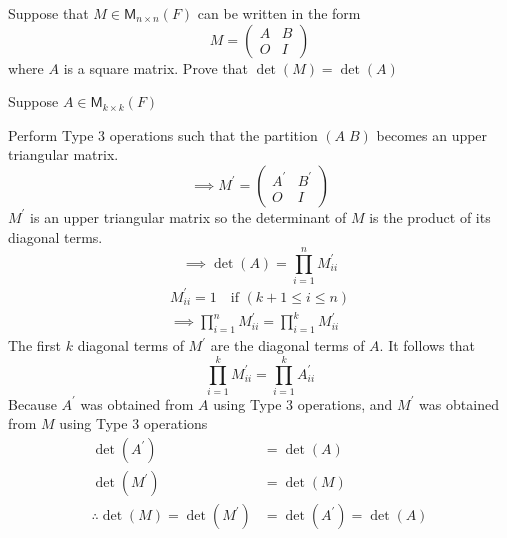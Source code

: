 Suppose that $M \in \mathsf{M}_{n\times n}(F)$ can be written in the
form 
\[
M = \begin{pmatrix} A & B\\O & I
\end{pmatrix}
\]
where $A$ is a square matrix. Prove that $\det{(M)} = \det{(A)}$

Suppose $A \in \mathsf{M}_{k\times k}(F)$

Perform Type 3 operations such that the partition $(A\; B)$ becomes an
upper triangular matrix.
\begin{equation}
\implies M^\prime = \begin{pmatrix} A^\prime & B^\prime \\ O & I
\end{pmatrix}
\end{equation}
$M^\prime$ is an upper triangular matrix so the determinant of $M$ is
the product of its diagonal terms.
\begin{equation}
\implies \det{(A)} = \prod\limits_{i=1}^n M^\prime_{ii}
\end{equation}
\begin{gather}
M^\prime_{ii} = 1 \quad \text{if } (k +1 \leq i \leq n)\\
\implies \prod\limits_{i=1}^n M^\prime_{ii} = \prod\limits_{i=1}^k
M^\prime_{ii}
\end{gather}
The first $k$ diagonal terms of $M^\prime$ are the diagonal terms of
$A$. It follows that
\begin{equation}
\prod\limits_{i=1}^k M^\prime_{ii} = \prod\limits_{i=1}^k A^\prime_{ii}
\end{equation}
Because $A^\prime$ was obtained from $A$ using Type 3 operations, and
$M^\prime$ was obtained from $M$ using Type 3 operations
\begin{align}
\det{(A^\prime)} &= \det{(A)}\\
\det{(M^\prime)} &= \det{(M)}\\
\therefore \det{(M)} = \det{(M^\prime)} &= \det{(A^\prime)} = \det{(A)}
\end{align}
